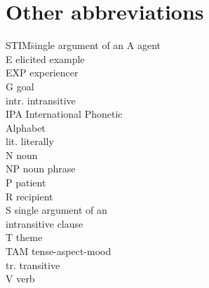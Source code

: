 \section*{Other abbreviations}
	\begin{multicols}{2}
		\begin{tabbing}
		  STIM\hspace{\tabcolsep}\= single argument of an\kill
			A 		\>	agent\\
			E	\>	elicited example\\
			EXP 	\>	experiencer\\
			G 		\>	goal\\
			intr. 	\>	intransitive\\
			IPA 	\>	International Phonetic\\
			{}		\>	Alphabet\\
			lit. 	\>	literally\\
			N 		\>	noun\\
			NP 		\>	noun phrase\\
			P 		\>	patient\\
			R 		\>	recipient\\
			S 		\>	single argument of an\\
			{}		\>	intransitive clause\\
			T 		\>	theme\\
			TAM 	\>	tense-aspect-mood\\
			tr. 	\>	transitive\\
			V 		\>	verb\\
		\end{tabbing}
	\end{multicols}
